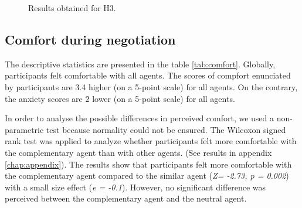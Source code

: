 \documentclass[10pt, a4paper]{article} %
\begin{document}
		
		\begin{figure}[!tbh]
			
			
			
			\caption{Results obtained for H3.}
			\label{fig:tour}
		\end{figure}
%	
	
	\subsection{Comfort during negotiation}
	
	The descriptive statistics are presented in the table \ref{tab:comfort}. Globally, participants felt comfortable with all agents.
	The scores of compfort enunciated by participants are 3.4 higher (on a 5-point scale) for all agents. On the contrary, the anxiety scores are 2 lower (on a 5-point scale) for all agents. 
	
	In order to analyse the possible differences in perceived comfort, we used a non-parametric test because normality could not be ensured. The Wilcoxon signed rank test was applied to analyze whether participants felt more comfortable with the complementary agent than with other agents. (See results in appendix \ref{chap:appendix}). 
	The results show that participants felt more comfortable with the complementary agent compared to the similar agent (\emph{Z= -2.73, p = 0.002})
	with a small size effect (\emph{e = -0.1}). However, no significant difference was perceived between the complementary agent and the neutral agent. 
	
\end{document}
